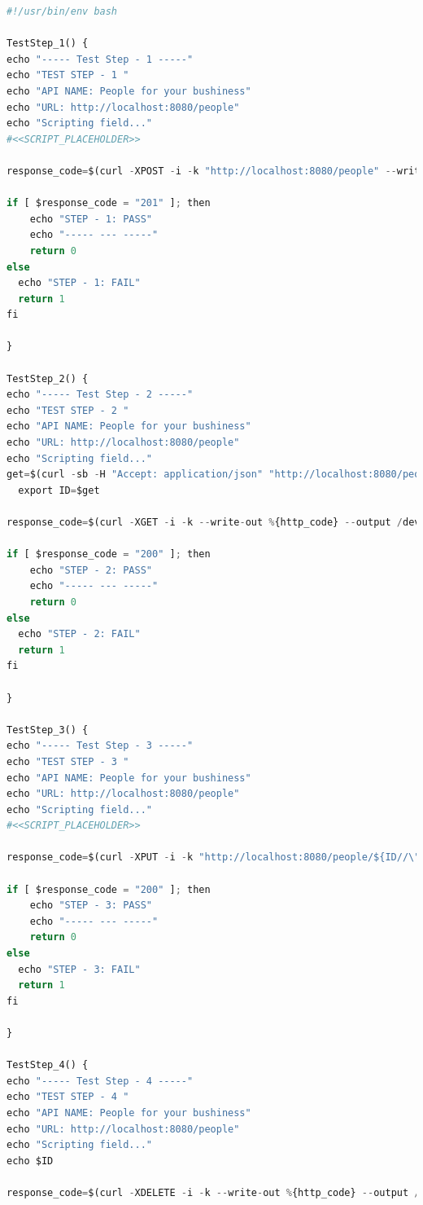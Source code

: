 \documentclass[a4paper,11pt]{book}
\begin{document}
\begin{lstlisting}[language=python,caption={  test\_people.sh }]
#!/usr/bin/env bash

TestStep_1() {
echo "----- Test Step - 1 -----"
echo "TEST STEP - 1 "
echo "API NAME: People for your bushiness"
echo "URL: http://localhost:8080/people"
echo "Scripting field..."
#<<SCRIPT_PLACEHOLDER>>

response_code=$(curl -XPOST -i -k "http://localhost:8080/people" --write-out %{http_code} --output /dev/null -d  '{"city":"CDMX","company":"CesarCorp","job":"develop","name":"John Smith"}' )

if [ $response_code = "201" ]; then
    echo "STEP - 1: PASS"
    echo "----- --- -----"
    return 0
else
  echo "STEP - 1: FAIL"
  return 1
fi

}

TestStep_2() {
echo "----- Test Step - 2 -----"
echo "TEST STEP - 2 "
echo "API NAME: People for your bushiness"
echo "URL: http://localhost:8080/people"
echo "Scripting field..."
get=$(curl -sb -H "Accept: application/json" "http://localhost:8080/people" | jq '.[0]._id')  
  export ID=$get

response_code=$(curl -XGET -i -k --write-out %{http_code} --output /dev/null http://localhost:8080/people)

if [ $response_code = "200" ]; then
    echo "STEP - 2: PASS"
    echo "----- --- -----"
    return 0
else
  echo "STEP - 2: FAIL"
  return 1
fi

}

TestStep_3() {
echo "----- Test Step - 3 -----"
echo "TEST STEP - 3 "
echo "API NAME: People for your bushiness"
echo "URL: http://localhost:8080/people"
echo "Scripting field..."
#<<SCRIPT_PLACEHOLDER>>

response_code=$(curl -XPUT -i -k "http://localhost:8080/people/${ID//\"}" --write-out %{http_code} --output /dev/null -d  '{"city":"CDMX_Update","company":"CesarCorp_Update","job":"develop_Update","name":"John Smith_Update"}' )

if [ $response_code = "200" ]; then
    echo "STEP - 3: PASS"
    echo "----- --- -----"
    return 0
else
  echo "STEP - 3: FAIL"
  return 1
fi

}

TestStep_4() {
echo "----- Test Step - 4 -----"
echo "TEST STEP - 4 "
echo "API NAME: People for your bushiness"
echo "URL: http://localhost:8080/people"
echo "Scripting field..."
echo $ID

response_code=$(curl -XDELETE -i -k --write-out %{http_code} --output /dev/null http://localhost:8080/people/${ID//\"})


\end{lstlisting}
\end{document}
